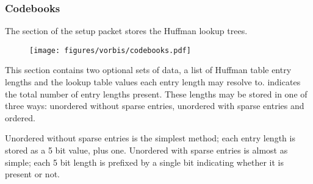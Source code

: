 \clearpage

\subsubsection{Codebooks}

The  section of the setup packet stores
the Huffman lookup trees.

\begin{figure}[h]
\texttt{[image: figures/vorbis/codebooks.pdf]}
\end{figure}
\par
\noindent
This section contains two optional sets of data,
a list of Huffman table entry lengths
and the lookup table values each entry length may resolve to.
 indicates the total number of entry lengths present.
These lengths may be stored in one of three ways:
unordered without sparse entries, unordered with sparse entries
and ordered.

Unordered without sparse entries is the simplest method;
each entry length is stored as a 5 bit value, plus one.
Unordered with sparse entries is almost as simple;
each 5 bit length is prefixed by a single bit indicating
whether it is present or not.

